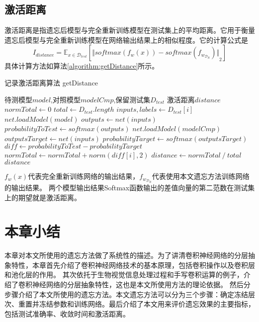 \subsection{激活距离}
激活距离是指遗忘后模型与完全重新训练模型在测试集上的平均距离。它用于衡量遗忘后模型与完全重新训练模型在网络输出结果上的相似程度。它的计算公式是
\begin{equation}
I_{distance} = {\mathbb{E}}_{x\in {\mathcal{D}_{test}}}[{\Vert softmax(f_w(x)) - softmax(f_{w_{\mathcal{D}_R}}) \Vert}_2 ] \label{equation:index_distance}
\end{equation}
具体计算方法如算法\ref{algorithm:getDistance}所示。
\begin{algorithm}
	\renewcommand{\algorithmicrequire}{\textbf{Input:}}
	\renewcommand{\algorithmicensure}{\textbf{Output:}}
	\caption{记录激活距离算法  getDistance}
	\label{algorithm:getDistance}
	\begin{algorithmic}[1]
        \REQUIRE 待测模型$model$,对照模型$modelCmp$,保留测试集$D_{test}$
        \ENSURE  激活距离$distance$
        \STATE $normTotal \gets 0$
        \STATE $total \gets D_{test}.length$
            \STATE $inputs, labels \gets D_{test}[i]$
            \STATE $net.loadModel(model)$
            \STATE $outputs \gets net(inputs)$
            \STATE $probabilityToTest \gets softmax(outputs)$
            \STATE $net.loadModel(modelCmp)$
            \STATE $outputsTarget \gets net(inputs)$
            \STATE $probabilityTarget \gets softmax(outputsTarget)$
            \STATE $diff \gets probabilityToTest - probabilityTarget $
                \STATE $normTotal \gets normTotal + norm(diff[i],2)$
            \ENDFOR
        \ENDFOR
        \STATE $distance \gets normTotal {\ } / {\ } total$
        \RETURN $distance$
	\end{algorithmic}  
\end{algorithm}

$f_w(x)$代表完全重新训练网络的输出结果，$f_{w_{\mathcal{D}_R}}$代表使用本文遗忘方法训练网络的输出结果。
两个模型输出结果Softmax函数输出的差值向量的第二范数在测试集上的期望就是激活距离。


\section{本章小结}
本章对本文所使用的遗忘方法做了系统性的描述。为了讲清卷积神经网络的分层抽象特性，本章首先介绍了卷积神经网络技术的基本原理，包括卷积操作以及卷积层和池化层的作用。
其次依托于生物视觉信息处理过程和手写卷积运算的例子，介绍了卷积神经网络的分层抽象特性，这也是本文所使用方法的理论依据。
然后分步骤介绍了本文所使用的遗忘方法。本文遗忘方法可以分为三个步骤：确定冻结层次、重置并冻结参数和训练网络。最后介绍了本文用来评价遗忘效果的主要指标，包括测试准确率、收敛时间和激活距离。
